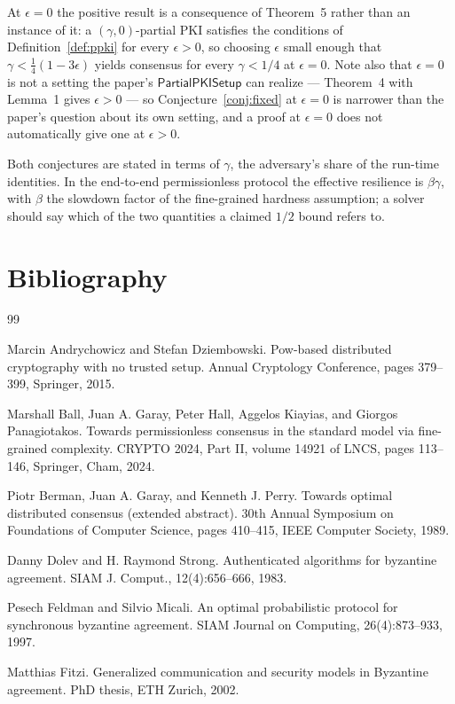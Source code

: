 \documentclass{aicr-conjecture}
\newcommand{\PPKISetup}{\mathsf{PartialPKISetup}}
\begin{document}
\begin{remark}
At $\epsilon = 0$ the positive result is a consequence of Theorem~5
rather than an instance of it: a $(\gamma,0)$-partial PKI satisfies the
conditions of Definition~\ref{def:ppki} for every $\epsilon > 0$, so
choosing $\epsilon$ small enough that $\gamma < \frac{1}{4}(1-3\epsilon)$
yields consensus for every $\gamma < 1/4$ at $\epsilon = 0$. Note also
that $\epsilon = 0$ is not a setting the paper's $\PPKISetup$ can
realize --- Theorem~4 with Lemma~1 gives $\epsilon > 0$ --- so
Conjecture~\ref{conj:fixed} at $\epsilon = 0$ is narrower than the
paper's question about its own setting, and a proof at $\epsilon = 0$
does not automatically give one at $\epsilon > 0$.
\end{remark}

\begin{remark}
Both conjectures are stated in terms of $\gamma$, the adversary's share
of the run-time identities. In the end-to-end permissionless protocol
the effective resilience is $\beta\gamma$, with $\beta$ the slowdown
factor of the fine-grained hardness assumption; a solver should say
which of the two quantities a claimed $1/2$ bound refers to.
\end{remark}

\section{Bibliography}

\begin{aicrbibliography}{99}

Marcin Andrychowicz and Stefan Dziembowski.
Pow-based distributed cryptography with no trusted setup.
Annual Cryptology Conference, pages 379--399, Springer, 2015.

Marshall Ball, Juan A. Garay, Peter Hall, Aggelos Kiayias, and Giorgos
Panagiotakos.
Towards permissionless consensus in the standard model via fine-grained
complexity.
CRYPTO 2024, Part II, volume 14921 of LNCS, pages 113--146, Springer,
Cham, 2024.

Piotr Berman, Juan A. Garay, and Kenneth J. Perry.
Towards optimal distributed consensus (extended abstract).
30th Annual Symposium on Foundations of Computer Science, pages
410--415, IEEE Computer Society, 1989.

Danny Dolev and H. Raymond Strong.
Authenticated algorithms for byzantine agreement.
SIAM J. Comput., 12(4):656--666, 1983.

Pesech Feldman and Silvio Micali.
An optimal probabilistic protocol for synchronous byzantine agreement.
SIAM Journal on Computing, 26(4):873--933, 1997.

Matthias Fitzi.
Generalized communication and security models in Byzantine agreement.
PhD thesis, ETH Zurich, 2002.

\end{aicrbibliography}
\end{document}
